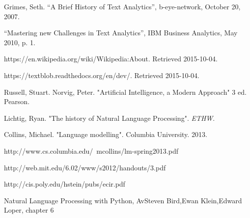 \documentclass[a4paper]{article}
\begin{document}
\begin{thebibliography}{9}
Grimes, Seth. “A Brief History of Text Analytics”, b-eye-network, October 20, 2007.

“Mastering new Challenges in Text Analytics”, IBM Business Analytics, May 2010, p. 1.

https://en.wikipedia.org/wiki/Wikipedia:About. Retrieved 2015-10-04.

https://textblob.readthedocs.org/en/dev/. Retrieved 2015-10-04.

Russell, Stuart. Norvig, Peter. "Artificial Intelligence, a Modern Approach" 3 ed. Pearson. 

Lichtig, Ryan. "The history of Natural Language Processing". \textit{ETHW}. 

Collins, Michael. "Language modelling". Columbia University. 2013.

http://www.cs.columbia.edu/~mcollins/lm-spring2013.pdf

http://web.mit.edu/6.02/www/s2012/handouts/3.pdf

http://cis.poly.edu/hstein/pubs/ecir.pdf

Natural Language Processing with Python, AvSteven Bird,Ewan Klein,Edward Loper, chapter 6

\end{thebibliography}






\end{document}
